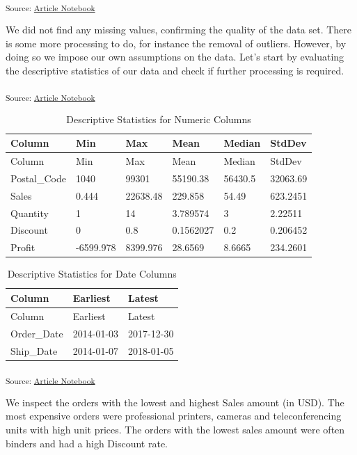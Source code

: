 \documentclass[
  letterpaper,
  DIV=11,
  numbers=noendperiod]{scrartcl}
\begin{document}
\textsubscript{Source:
\href{https://SJbrou.github.io/Supply_Chain_Data_Analysis/index.qmd.html}{Article
Notebook}}

We did not find any missing values, confirming the quality of the data
set. There is some more processing to do, for instance the removal of
outliers. However, by doing so we impose our own assumptions on the
data. Let's start by evaluating the descriptive statistics of our data
and check if further processing is required.

\textsubscript{Source:
\href{https://SJbrou.github.io/Supply_Chain_Data_Analysis/index.qmd.html}{Article
Notebook}}

\begin{longtable}[]{@{}llllll@{}}
\caption{Descriptive Statistics for Numeric Columns}\tabularnewline
\toprule\noalign{}
Column & Min & Max & Mean & Median & StdDev \\
\midrule\noalign{}
\endfirsthead
\toprule\noalign{}
Column & Min & Max & Mean & Median & StdDev \\
\midrule\noalign{}
\endhead
\bottomrule\noalign{}
\endlastfoot
Postal\_Code & 1040 & 99301 & 55190.38 & 56430.5 & 32063.69 \\
Sales & 0.444 & 22638.48 & 229.858 & 54.49 & 623.2451 \\
Quantity & 1 & 14 & 3.789574 & 3 & 2.22511 \\
Discount & 0 & 0.8 & 0.1562027 & 0.2 & 0.206452 \\
Profit & -6599.978 & 8399.976 & 28.6569 & 8.6665 & 234.2601 \\
\end{longtable}

\begin{longtable}[]{@{}lll@{}}
\caption{Descriptive Statistics for Date Columns}\tabularnewline
\toprule\noalign{}
Column & Earliest & Latest \\
\midrule\noalign{}
\endfirsthead
\toprule\noalign{}
Column & Earliest & Latest \\
\midrule\noalign{}
\endhead
\bottomrule\noalign{}
\endlastfoot
Order\_Date & 2014-01-03 & 2017-12-30 \\
Ship\_Date & 2014-01-07 & 2018-01-05 \\
\end{longtable}

\textsubscript{Source:
\href{https://SJbrou.github.io/Supply_Chain_Data_Analysis/index.qmd.html}{Article
Notebook}}

We inspect the orders with the lowest and highest Sales amount (in USD).
The most expensive orders were professional printers, cameras and
teleconferencing units with high unit prices. The orders with the lowest
sales amount were often binders and had a high Discount rate.
\end{document}
